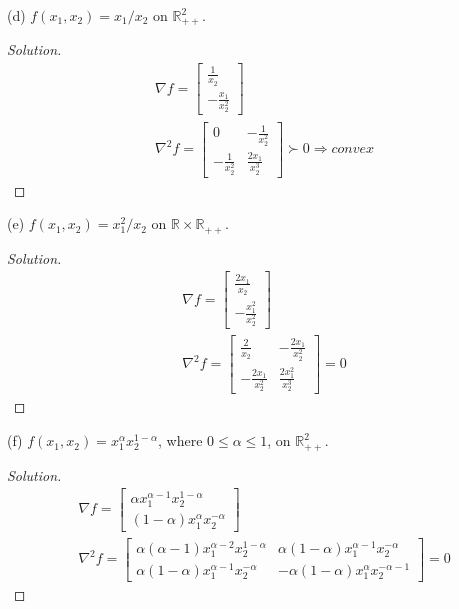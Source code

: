 \documentclass[11pt]{article}
\newenvironment{solution}
  {\renewcommand\qedsymbol{$\square$}\begin{proof}[Solution]}
  {\end{proof}}
\newcommand{\grad}{\nabla}
\newcommand{\hess}{\nabla^2}
\newcommand{\RR}{\mathbb{R}}
\begin{document}
(d) $f\left(x_1, x_2\right)=x_1 / x_2$ on $\RR_{++}^2$.
\begin{solution}
  \begin{align*}
    &\grad f = 
    \begin{bmatrix}
      \frac{1}{x_2} \\ -\frac{x_1}{x_2^2}
    \end{bmatrix}\\
    &\hess f = 
    \begin{bmatrix}
      0 & -\frac{1}{x_2^2} \\ -\frac{1}{x_2^2} & \frac{2x_1}{x_2^3}
    \end{bmatrix}\succ 0 \Rightarrow convex
  \end{align*}
\end{solution}

(e) $f\left(x_1, x_2\right)=x_1^2 / x_2$ on $\RR \times \RR_{++}$.
\begin{solution}
  \begin{align*}
    &\grad f = 
    \begin{bmatrix}
      \frac{2x_1}{x_2} \\ -\frac{x_1^2}{x_2^2}
    \end{bmatrix}\\
    &\hess f = 
    \begin{bmatrix}
      \frac{2}{x_2} & -\frac{2x_1}{x_2^2} \\ -\frac{2x_1}{x_2^2} & \frac{2x_1^2}{x_2^3}
    \end{bmatrix} = 0
  \end{align*}
\end{solution}

(f) $f\left(x_1, x_2\right)=x_1^\alpha x_2^{1-\alpha}$, where $0 \leq \alpha \leq 1$, on $\RR_{++}^2$.
\begin{solution}
  \begin{align*}
    &\grad f = 
    \begin{bmatrix}
      \alpha x_1^{\alpha-1} x_2^{1-\alpha} \\ (1-\alpha) x_1^\alpha x_2^{-\alpha}
    \end{bmatrix}\\
    &\hess f = 
    \begin{bmatrix}
      \alpha(\alpha-1) x_1^{\alpha-2} x_2^{1-\alpha} & \alpha(1-\alpha) x_1^{\alpha-1} x_2^{-\alpha}\\
      \alpha(1-\alpha) x_1^{\alpha-1} x_2^{-\alpha} & -\alpha(1-\alpha) x_1^{\alpha} x_2^{-\alpha - 1}
    \end{bmatrix} = 0
  \end{align*}
\end{solution}
\end{document}
